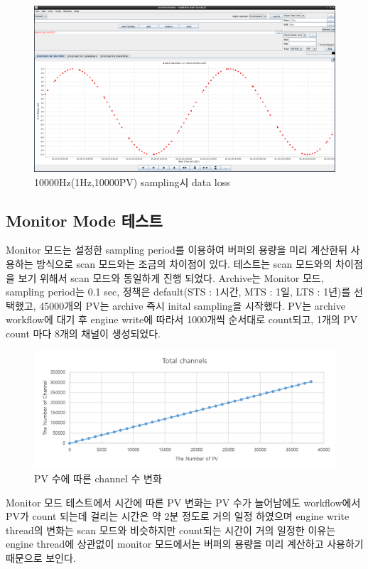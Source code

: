 \documentclass[11pt
  , a4paper
  , article
  , oneside
]{memoir}
\begin{document}
		\begin{figure}[h!]
			\centering
			\includegraphics[width=1\textwidth, height=0.5\textheight]{./images/a4.png}
			\caption{10000Hz(1Hz,10000PV) sampling시 data loss}
		\end{figure}
		
\subsection{Monitor Mode 테스트}
Monitor 모드는 설정한 sampling period를 이용하여 버퍼의 용량을 미리 계산한뒤 사용하는 방식으로 scan 모드와는 조금의 차이점이 있다. 테스트는 scan 모드와의 차이점을 보기 위해서 scan 모드와 동일하게 진행 되었다. Archive는 Monitor 모드, sampling period는 0.1 sec, 정책은 default(STS : 1시간, MTS : 1일, LTS : 1년)를 선택했고, 45000개의 PV는 archive 즉시 inital sampling을 시작했다. PV는 archive workflow에 대기 후 engine write에 따라서 1000개씩 순서대로 count되고, 1개의 PV count 마다 8개의 채널이 생성되었다.
\clearpage

		\begin{figure}[h!]
			\centering
			\includegraphics[width=1\textwidth, height=0.3\textheight]{./images/channel1.png}
			\caption{PV 수에 따른 channel 수 변화}
		\end{figure}

Monitor 모드 테스트에서 시간에 따른 PV 변화는 PV 수가 늘어남에도 workflow에서 PV가 count 되는데 걸리는 시간은 약 2분 정도로 거의 일정 하였으며 engine write thread의 변화는 scan 모드와 비슷하지만 count되는 시간이 거의 일정한 이유는 engine thread에 상관없이 monitor 모드에서는 버퍼의 용량을 미리 계산하고 사용하기 때문으로 보인다.
\end{document}
